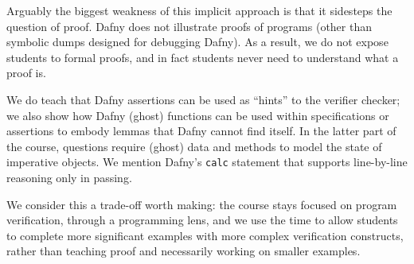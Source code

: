 Arguably the biggest weakness of this implicit approach
is that it sidesteps the question of proof.
Dafny does not illustrate proofs of programs
(other than symbolic dumps designed for debugging Dafny).
As a result, we do not expose students to formal proofs,
and in fact students never need to understand what a proof is.

We do teach that Dafny assertions can be used as ``hints'' to the verifier checker; we also show how Dafny (ghost) functions can be used within specifications or assertions to embody lemmas that Dafny cannot find itself.  In the latter part of the course, questions require (ghost) data and methods to model the state of imperative objects. We mention Dafny's \texttt{calc} statement that supports line-by-line reasoning only in passing. 

We consider this a trade-off worth making: the course stays focused on program verification, through a programming lens, 
and we use the time to allow students to complete more significant examples with more complex verification constructs,
rather than teaching proof and necessarily working on smaller examples. 

